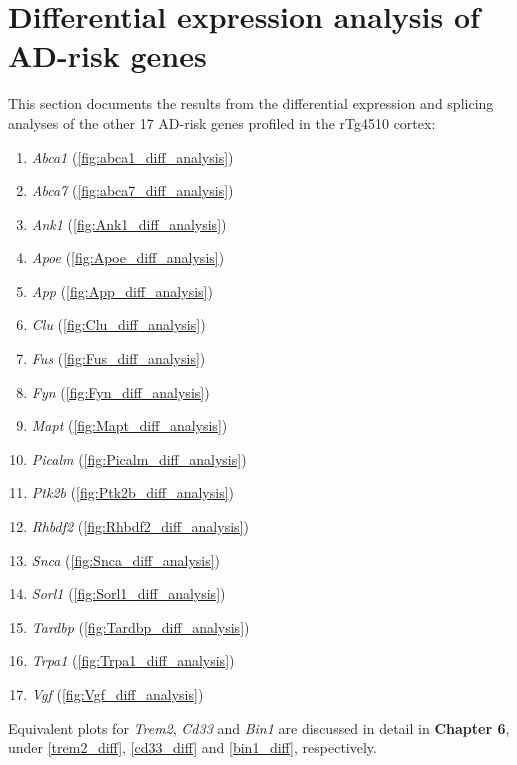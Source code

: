 \chapter{Differential expression analysis of AD-risk genes}\label{app_diff_adrisk_others}

This section documents the results from the differential expression and splicing analyses of the other 17 AD-risk genes profiled in the rTg4510 cortex: 
\begin{multicols}{2}
\begin{enumerate}
	\item \textit{Abca1} (\cref{fig:abca1_diff_analysis})
	\item \textit{Abca7} (\cref{fig:abca7_diff_analysis})
	\item \textit{Ank1} (\cref{fig:Ank1_diff_analysis})
	\item \textit{Apoe} (\cref{fig:Apoe_diff_analysis})
	\item \textit{App} (\cref{fig:App_diff_analysis})
	\item \textit{Clu} (\cref{fig:Clu_diff_analysis})
	\item \textit{Fus} (\cref{fig:Fus_diff_analysis})
	\item \textit{Fyn} (\cref{fig:Fyn_diff_analysis})
	\item \textit{Mapt} (\cref{fig:Mapt_diff_analysis})
	\item \textit{Picalm} (\cref{fig:Picalm_diff_analysis})
	\item \textit{Ptk2b} (\cref{fig:Ptk2b_diff_analysis})
	\item \textit{Rhbdf2} (\cref{fig:Rhbdf2_diff_analysis})
	\item \textit{Snca} (\cref{fig:Snca_diff_analysis})
	\item \textit{Sorl1} (\cref{fig:Sorl1_diff_analysis})
	\item \textit{Tardbp} (\cref{fig:Tardbp_diff_analysis})
	\item \textit{Trpa1} (\cref{fig:Trpa1_diff_analysis})
	\item \textit{Vgf} (\cref{fig:Vgf_diff_analysis})
\end{enumerate}
\end{multicols}
Equivalent plots for \textit{Trem2}, \textit{Cd33} and \textit{Bin1} are discussed in detail in \textbf{Chapter 6}, under \cref{trem2_diff}, \cref{cd33_diff} and \cref{bin1_diff}, respectively.


